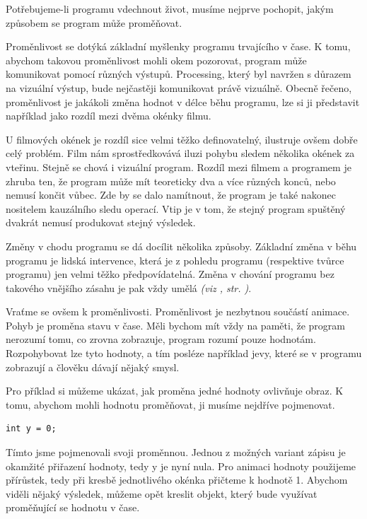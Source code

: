 \documentclass[10pt]{book}
\newcommand{\odkaz}[1]{\textit{(viz \nameref{#1}, str. \pageref*{#1})}}
\begin{document}
Potřebujeme-li programu vdechnout život, musíme nejprve pochopit, jakým způsobem se program může proměňovat.

Proměnlivost se dotýká základní myšlenky programu trvajícího v čase. K tomu, abychom takovou proměnlivost mohli okem pozorovat, program může komunikovat pomocí různých výstupů. Processing, který byl navržen s důrazem na vizuální výstup, bude nejčastěji komunikovat právě vizuálně. Obecně řečeno, proměnlivost je jakákoli změna hodnot v délce běhu programu, lze si ji představit například jako rozdíl mezi dvěma okénky filmu.

U filmových okének je rozdíl sice velmi těžko definovatelný, ilustruje ovšem dobře celý problém. Film nám sprostředkovává iluzi pohybu sledem několika okének za vteřinu. Stejně se chová i vizuální program. Rozdíl mezi filmem a programem je zhruba ten, že program může mít teoreticky dva a více různých konců, nebo nemusí končit vůbec. Zde by se dalo namítnout, že program je také nakonec nositelem kauzálního sledu operací. Vtip je v tom, že stejný program spuštěný dvakrát nemusí produkovat stejný výsledek.

Změny v chodu programu se dá docílit několika způsoby. Základní změna v běhu programu je lidská intervence, která je z pohledu programu (respektive tvůrce programu) jen velmi těžko předpovídatelná. Změna v chování programu bez takového vnějšího zásahu je pak vždy umělá \odkaz{Náhoda}.


Vraťme se ovšem k proměnlivosti. Proměnlivost je nezbytnou součástí animace. Pohyb je proměna stavu v čase. Měli bychom mít vždy na paměti, že program nerozumí tomu, co zrovna zobrazuje, program rozumí pouze hodnotám. Rozpohybovat lze tyto hodnoty, a tím posléze například jevy, které se v programu zobrazují a člověku dávají nějaký smysl. 

Pro příklad si můžeme ukázat, jak proměna jedné hodnoty ovlivňuje obraz. K tomu, abychom mohli hodnotu proměňovat, ji musíme nejdříve pojmenovat.

\begin{lstlisting}
int y = 0;
\end{lstlisting}

Tímto jsme pojmenovali svoji proměnnou. Jednou z možných variant zápisu je okamžité přiřazení hodnoty, tedy y je nyní nula. Pro animaci hodnoty použijeme přírůstek, tedy při kresbě jednotlivého okénka přičteme k hodnotě 1. Abychom viděli nějaký výsledek, můžeme opět kreslit objekt, který bude využívat proměňující se hodnotu v čase.
\end{document}
